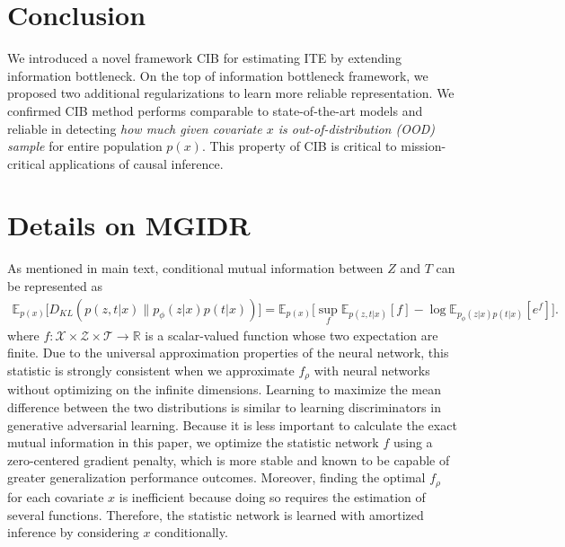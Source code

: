 \documentclass{article}
\begin{document}
\section{Conclusion}
    \vspace{-.15cm}
    We introduced a novel framework CIB for estimating ITE by extending information bottleneck. On the top of information bottleneck framework, we proposed two additional regularizations to learn more reliable representation. We confirmed CIB method performs comparable to state-of-the-art models and reliable in detecting \textit{how much given covariate $x$ is out-of-distribution (OOD) sample} for entire population $p(x)$. This property of CIB is critical to mission-critical applications of causal inference.








\newpage
\appendix
\section{Details on MGIDR}
    As mentioned in main text, conditional mutual information between $Z$ and $T$ can be represented as
    \begin{align*}
\mathbb{E}_{p(x)}\big[D_{KL}(p(z,t|x)\|p_{\phi}(z|x)p(t|x))\big]
        =\mathbb{E}_{p(x)}\Big[\sup_{f} \mathbb{E}_{p(z,t|x)}[f] - \log \mathbb{E}_{p_{\phi}(z|x)p(t|x)}[e^{f}]\Big].
    \end{align*}
    where $f : \mathcal{X} \times \mathcal{Z} \times \mathcal{T} \rightarrow \mathbb{R}$ is a scalar-valued function whose two expectation are finite. Due to the universal approximation properties of the neural network, this statistic is strongly consistent when we approximate $ f_{\rho} $ with neural networks without optimizing on the infinite dimensions\cite{Belghazi18}. Learning to maximize the mean difference between the two distributions is similar to learning discriminators in generative adversarial learning. Because it is less important to calculate the exact mutual information in this paper, we optimize the statistic network $f$ using a zero-centered gradient penalty\cite{Thanh19}, which is more stable and known to be capable of greater generalization performance outcomes. Moreover, finding the optimal $f_{\rho}$ for each covariate $x$ is inefficient because doing so requires the estimation of several functions. Therefore, the statistic network is learned with amortized inference by considering $ x $ conditionally.
\end{document}
